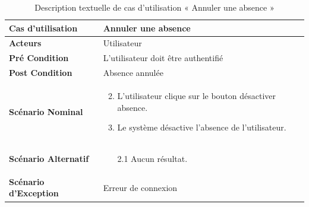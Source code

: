 \begin{longtable}{|p{5cm}|p{10cm}|}
  \caption{Description textuelle de cas d'utilisation « Annuler une absence     »} \label{tab:use_case_cancel_absence} \\
\hline
\textbf{Cas d'utilisation}&Annuler une absence     \\
\hline
\textbf{Acteurs}&Utilisateur\\
\hline
\textbf{Pré Condition}&L'utilisateur doit être authentifié\\
\hline
\textbf{Post Condition}&Absence annulée \\
\hline
\textbf{Scénario Nominal}&
\vspace{-\baselineskip}
\begin{enumerate}
  \setcounter{enumi}{1}
  \item L'utilisateur clique sur le bouton désactiver absence.
  \item Le système désactive l'absence de l'utilisateur.
\end{enumerate}\\
\hline
\textbf{Scénario Alternatif}&
\vspace{-\baselineskip}
\begin{enumerate}
 \item [2.1] Aucun résultat.
\end{enumerate}\\
\hline
\textbf{Scénario d'Exception}&
Erreur de connexion\\
\hline

\end{longtable}



